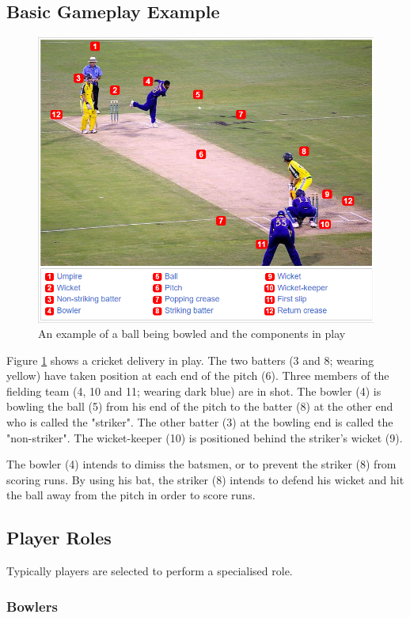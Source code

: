 \documentclass[12pt,a4paper]{report}
\theoremstyle{definition}
\begin{document}
\subsection{Basic Gameplay Example}

\begin{figure}[H]
    \centering
    \includegraphics[width=0.8\linewidth]{Cricket_Delivery.png}
    \caption{An example of a ball being bowled and the components in play \citep{cricketWiki}}
    \label{fig:Delivery}
\end{figure}

Figure \ref{fig:Delivery} shows a cricket delivery in play. 
The two batters (3 and 8; wearing yellow) have taken position at each end of the pitch (6). 
Three members of the fielding team (4, 10 and 11; wearing dark blue) are in shot. 
The bowler (4) is bowling the ball (5) from his end of the pitch to the batter (8) at the other end who is called the "striker". 
The other batter (3) at the bowling end is called the "non-striker". 
The wicket-keeper (10) is positioned behind the striker's wicket (9).

The bowler (4) intends to dimiss the batsmen, or to prevent the striker (8) from scoring runs. 
By using his bat, the striker (8) intends to defend his wicket and hit the ball away from the pitch in order to score runs.

\subsection{Player Roles}

Typically players are selected to perform a specialised role.

\subsubsection{Bowlers}
\end{document}
